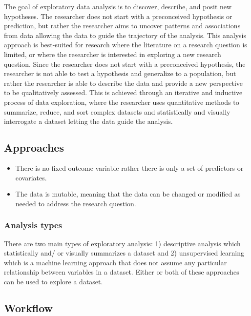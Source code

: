 \documentclass[
  letterpaper,
]{latex/krantz}
\providecommand{\tightlist}{%
  \setlength{\itemsep}{0pt}\setlength{\parskip}{0pt}}\usepackage{longtable,booktabs,array}
\begin{document}
The goal of exploratory data analysis is to discover, describe, and
posit new hypotheses. The researcher does not start with a preconceived
hypothesis or prediction, but rather the researcher aims to uncover
patterns and associations from data allowing the data to guide the
trajectory of the analysis. This analysis approach is best-suited for
research where the literature on a research question is limited, or
where the researcher is interested in exploring a new research question.
Since the researcher does not start with a preconceived hypothesis, the
researcher is not able to test a hypothesis and generalize to a
population, but rather the researcher is able to describe the data and
provide a new perspective to be qualitatively assessed. This is achieved
through an iterative and inductive process of data exploration, where
the researcher uses quantitative methods to summarize, reduce, and sort
complex datasets and statistically and visually interrogate a dataset
letting the data guide the analysis.

\hypertarget{eda-approaches}{%
\subsection{Approaches}\label{eda-approaches}}

\begin{itemize}
\tightlist
\item
  There is no fixed outcome variable rather there is only a set of
  predictors or covariates.
\item
  The data is mutable, meaning that the data can be changed or modified
  as needed to address the research question.
\end{itemize}

\hypertarget{eda-analysis-types}{%
\subsubsection{Analysis types}\label{eda-analysis-types}}

There are two main types of exploratory analysis: 1) descriptive
analysis which statistically and/ or visually summarizes a dataset and
2) unsupervised learning which is a machine learning approach that does
not assume any particular relationship between variables in a dataset.
Either or both of these approaches can be used to explore a dataset.

\hypertarget{eda-workflow}{%
\subsection{Workflow}\label{eda-workflow}}
\end{document}
